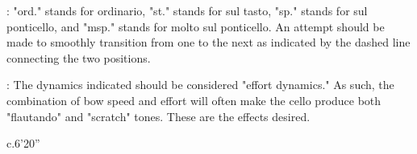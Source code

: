 \documentclass[10pt]{article}
\begin{document}
: "ord." stands for ordinario, "st." stands for sul tasto, "sp." stands for sul ponticello, and "msp." stands for molto sul ponticello. An attempt should be made to smoothly transition from one to the next as indicated by the dashed line connecting the two positions.

: The dynamics indicated should be considered "effort dynamics." As such, the combination of bow speed and effort will often make the cello produce both "flautando" and "scratch" tones. These are the effects desired.

\vspace*{6\baselineskip}

\begin{center}
c.6'20''
\end{center}
\end{document}
